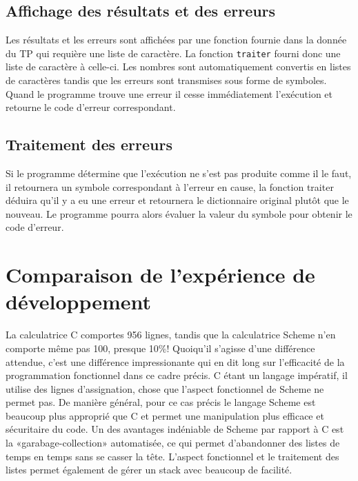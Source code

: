 \documentclass[11pt]{article}
\begin{document}
\subsection{Affichage des résultats et des erreurs}
Les résultats et les erreurs sont affichées par une fonction fournie dans la donnée du TP qui requière une liste de caractère. La fonction \texttt{traiter} fourni donc une liste de caractère à celle-ci. Les nombres sont automatiquement convertis en listes de caractères tandis que les erreurs sont transmises sous forme de symboles. Quand le programme trouve une erreur il cesse immédiatement l'exécution et retourne le code d'erreur correspondant.

\subsection{Traitement des erreurs}
Si le programme détermine que l'exécution ne s'est pas produite comme il le faut, il retournera un symbole correspondant à l'erreur en cause, la fonction traiter déduira qu'il y a eu une erreur et retournera le dictionnaire original plutôt que le nouveau. Le programme pourra alors évaluer la valeur du symbole pour obtenir le code d'erreur.

\pagebreak

\section{Comparaison de l’expérience de développement}
La calculatrice C comportes 956 lignes, tandis que la calculatrice Scheme n'en comporte
même pas 100, presque 10\%! Quoiqu'il s’agisse d’une différence attendue, c'est une différence impressionante qui en dit long sur l'efficacité de la programmation fonctionnel dans ce cadre précis. C étant un langage impératif, il utilise des lignes
d’assignation, chose que l’aspect fonctionnel de Scheme ne permet pas.
De manière général, pour ce cas précis le langage Scheme est beaucoup plus approprié que C et permet une manipulation plus efficace et sécuritaire du code. Un des avantages indéniable de Scheme par rapport à C est la «garabage-collection» automatisée, ce qui permet d'abandonner des listes de temps en temps sans se casser la tête. L'aspect fonctionnel et le traitement des listes permet également de gérer un stack avec beaucoup de facilité.
\end{document}
